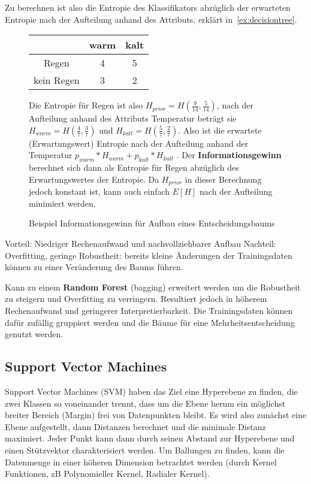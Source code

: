 \documentclass{article}
\begin{document}
Zu berechnen ist also die Entropie des Klassifikators abzüglich der erwarteten Entropie nach der Aufteilung anhand des Attributs, 
erklärt in~\autoref{ex:decisiontree}.
\begin{figure}[H]
\begin{minipage}{.3\textwidth}
\begin{tabular}{c|c|c}
    & warm & kalt \\
    \hline
    Regen &4  &5 \\
    \hline
    kein Regen & 3 & 2 \\
\end{tabular}
\end{minipage}
\begin{minipage}{.6\textwidth}
Die Entropie für Regen ist also $H_{prior} = H(\frac{9}{14},\frac{5}{14})$, 
nach der Aufteilung anhand des Attributs Temperatur beträgt sie $H_{warm}= H(\frac{4}{7}, \frac{3}{7})$
und $H_{kalt}= H(\frac{5}{7}, \frac{2}{7})$.
Also ist die erwartete (Erwartungswert) Entropie nach der Aufteilung anhand der Temperatur $p_{warm} * H_{warm} + p_{kalt} * H_{kalt} $ .
Der \textbf{Informationsgewinn} berechnet sich dann als Entropie für Regen abzüglich des Erwartungswertes der Entropie.
Da $H_{prior}$ in dieser Berechnung jedoch konstant ist, kann auch einfach $E[H]$ nach der Aufteilung minimiert werden.
\end{minipage}
\caption{Beispiel Informationsgewinn für Aufbau eines Entscheidungsbaums}
\label{ex:decisiontree}
\end{figure}


Vorteil: Niedriger Rechenaufwand und nachvollziehbarer Aufbau 
Nachteil: Overfitting, geringe Robustheit: bereits kleine Änderungen der Trainingsdaten können zu einer Veränderung des Baums führen.


Kann zu einem \textbf{Random Forest} (bagging) erweitert werden um die Robustheit zu steigern und Overfitting zu verringern.
Resultiert jedoch in höherem Rechenaufwand und geringerer Interpretierbarkeit.
Die Trainingsdaten können dafür zufällig gruppiert werden und die Bäume für eine Mehrheitsentscheidung genutzt werden.



\subsection{Support Vector Machines}
Support Vector Machines (SVM) haben das Ziel eine Hyperebene zu finden, die zwei Klassen so voneinander trennt,
dass um die Ebene herum ein möglichst breiter Bereich (Margin) frei von Datenpunkten bleibt.
Es wird also zunächst eine Ebene aufgestellt, dann Distanzen berechnet und die minimale Distanz maximiert.
Jeder Punkt kann dann durch seinen Abstand zur Hyperebene und einen Stützvektor charakterisiert werden.
Um Ballungen zu finden, kann die Datenmenge in einer höheren Dimension betrachtet werden (durch Kernel Funktionen, zB Polynomieller Kernel, Radialer Kernel).
\end{document}
